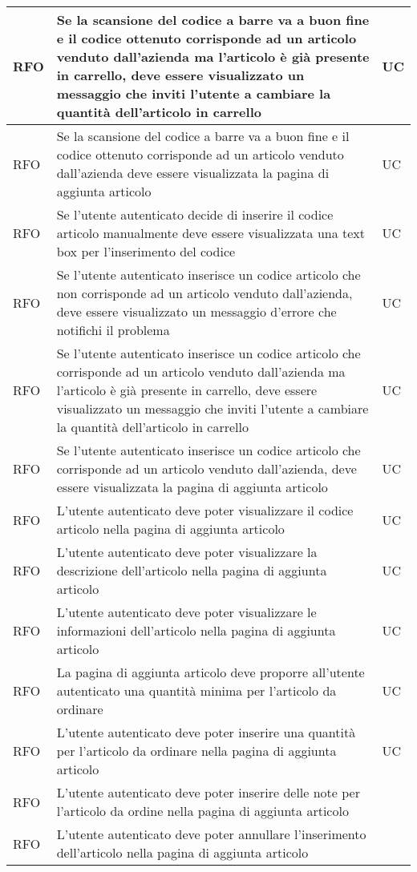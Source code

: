 \begin{center}
\begin{longtable}{ | >{\centering\arraybackslash}m{2.5cm} | >{\centering\arraybackslash}m{8cm} | >{\centering\arraybackslash}m{2.5cm} | }
RFO & Se la scansione del codice a barre va a buon fine e il codice ottenuto corrisponde ad un articolo venduto dall'azienda ma l'articolo è già presente in carrello, deve essere visualizzato un messaggio che inviti l'utente a cambiare la quantità dell'articolo in carrello & UC \\ \hline
RFO & Se la scansione del codice a barre va a buon fine e il codice ottenuto corrisponde ad un articolo venduto dall'azienda deve essere visualizzata la pagina di aggiunta articolo & UC \\ \hline
RFO & Se l'utente autenticato decide di inserire il codice articolo manualmente deve essere visualizzata una text box per l'inserimento del codice & UC \\ \hline
RFO & Se l'utente autenticato inserisce un codice articolo che non corrisponde ad un articolo venduto dall'azienda, deve essere visualizzato un messaggio d'errore che notifichi il problema & UC \\ \hline
RFO & Se l'utente autenticato inserisce un codice articolo che corrisponde ad un articolo venduto dall'azienda ma l'articolo è già presente in carrello, deve essere visualizzato un messaggio che inviti l'utente a cambiare la quantità dell'articolo in carrello & UC \\ \hline
RFO & Se l'utente autenticato inserisce un codice articolo che corrisponde ad un articolo venduto dall'azienda, deve essere visualizzata la pagina di aggiunta articolo & UC \\ \hline
RFO & L'utente autenticato deve poter visualizzare il codice articolo nella pagina di aggiunta articolo & UC \\ \hline
RFO & L'utente autenticato deve poter visualizzare la descrizione dell'articolo nella pagina di aggiunta articolo & UC \\ \hline
RFO & L'utente autenticato deve poter visualizzare le informazioni dell'articolo nella pagina di aggiunta articolo & UC \\ \hline
RFO & La pagina di aggiunta articolo deve proporre all'utente autenticato una quantità minima per l'articolo da ordinare & UC \\ \hline
RFO & L'utente autenticato deve poter inserire una quantità per l'articolo da ordinare nella pagina di aggiunta articolo & UC \\ \hline
RFO & L'utente autenticato deve poter inserire delle note per l'articolo da ordine nella pagina di aggiunta articolo & \\ \hline
RFO & L'utente autenticato deve poter annullare l'inserimento dell'articolo nella pagina di aggiunta articolo & \\ \hline

\end{longtable}
\end{center}
